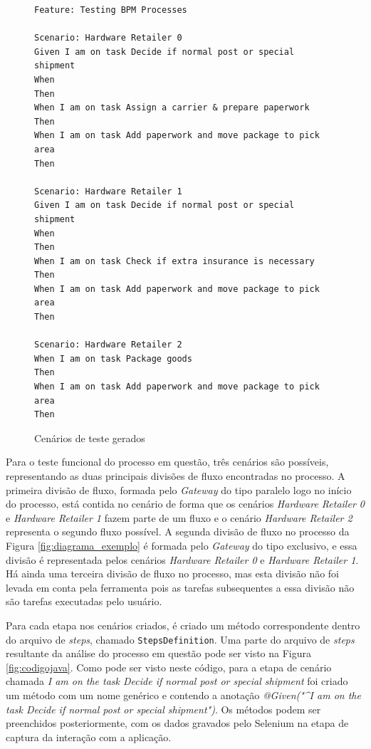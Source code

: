 \documentclass[12pt]{article}
\begin{document}
\begin{figure}[ht]
\centering
\begin{lstlisting}[language=Gherkin,frame=single,basicstyle=\footnotesize\ttfamily]
Feature: Testing BPM Processes  
 
Scenario: Hardware Retailer 0 
Given I am on task Decide if normal post or special shipment 
When 
Then 
When I am on task Assign a carrier & prepare paperwork 
Then 
When I am on task Add paperwork and move package to pick area 
Then 
 
Scenario: Hardware Retailer 1 
Given I am on task Decide if normal post or special shipment 
When 
Then 
When I am on task Check if extra insurance is necessary 
Then 
When I am on task Add paperwork and move package to pick area 
Then 
 
Scenario: Hardware Retailer 2
When I am on task Package goods 
Then 
When I am on task Add paperwork and move package to pick area 
Then 
\end{lstlisting}
\caption{Cenários de teste gerados}
\label{fig:cenarios}
\end{figure}

Para o teste funcional do processo em questão, três cenários são possíveis, representando as duas principais divisões de fluxo encontradas no processo. A primeira divisão de fluxo, formada pelo \emph{Gateway} do tipo paralelo logo no início do processo, está contida no cenário de forma que os cenários \emph{Hardware Retailer 0} e \emph{Hardware Retailer 1} fazem parte de um fluxo e o cenário \emph{Hardware Retailer 2} representa o segundo fluxo possível. A segunda divisão de fluxo no processo da Figura \ref{fig:diagrama_exemplo} é formada pelo \emph{Gateway} do tipo exclusivo, e essa divisão é representada pelos cenários \emph{Hardware Retailer 0} e \emph{Hardware Retailer 1}. Há ainda uma terceira divisão de fluxo no processo, mas esta divisão não foi levada em conta pela ferramenta pois as tarefas subsequentes a essa divisão não são tarefas executadas pelo usuário.

Para cada etapa nos cenários criados, é criado um método correspondente dentro do arquivo de \emph{steps}, chamado \texttt{StepsDefinition}. Uma parte do arquivo de \emph{steps} resultante da análise do processo em questão pode ser visto na Figura \ref{fig:codigojava}. Como pode ser visto neste código, para a etapa de cenário chamada \emph{I am on the task Decide if normal post or special shipment} foi criado um método com um nome genérico e contendo a anotação \emph{@Given("\^{}I am on the task Decide if normal post or special shipment\textdollar{}")}. Os métodos podem ser preenchidos posteriormente, com os dados gravados pelo Selenium na etapa de captura da interação com a aplicação.
\end{document}
